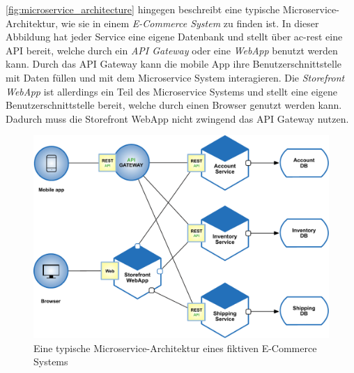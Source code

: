     \autoref{fig:microservice_architecture} hingegen beschreibt eine typische Microservice-Architektur, wie sie in einem \emph{E-Commerce System} zu finden ist. In dieser Abbildung hat jeder Service eine eigene Datenbank und stellt über \gls{ac-rest} eine API bereit, welche durch ein \emph{API Gateway} oder eine \emph{WebApp} benutzt werden kann. Durch das API Gateway kann die mobile App ihre Benutzerschnittstelle mit Daten füllen und mit dem Microservice System interagieren. Die \emph{Storefront WebApp} ist allerdings ein Teil des Microservice Systems und stellt eine eigene Benutzerschnittstelle bereit, welche durch einen Browser genutzt werden kann. Dadurch muss die Storefront WebApp nicht zwingend das API Gateway nutzen.
    \clearpage

    \begin{figure}[!ht]
      \centering
        \includegraphics[width=.95\textwidth]{res/img/MS_architecture.pdf}
      \caption{Eine typische Microservice-Architektur eines fiktiven E-Commerce Systems \parencite{richardson2019msarchitecture}}
      \label{fig:microservice_architecture}
    \end{figure}

